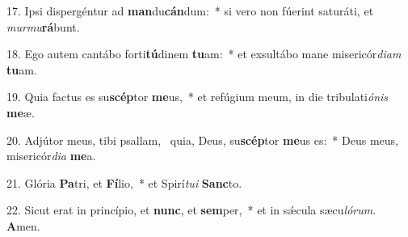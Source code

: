 17. Ipsi dispergéntur ad \textbf{man}du\textbf{cán}dum:~*  si vero non fúerint saturáti, et \textit{mur}\textit{mu}\textbf{rá}bunt.\

18. Ego autem cantábo forti\textbf{tú}dinem \textbf{tu}am:~*  et exsultábo mane misericór\textit{di}\textit{am} \textbf{tu}am.\

19. Quia factus es su\textbf{scép}tor \textbf{me}us,~*  et refúgium meum, in die tribulati\textit{ó}\textit{nis} \textbf{me}æ.\

20. Adjútor meus, tibi psallam, \dag\  quia, Deus, su\textbf{scép}tor \textbf{me}us es:~*  Deus meus, misericór\textit{di}\textit{a} \textbf{me}a.\

21. Glória \textbf{Pa}tri, et \textbf{Fí}lio,~*  et Spirí\textit{tu}\textit{i} \textbf{Sanc}to.\

22. Sicut erat in princípio, et \textbf{nunc}, et \textbf{sem}per,~*  et in sǽcula sæcu\textit{ló}\textit{rum}. \textbf{A}men.\

